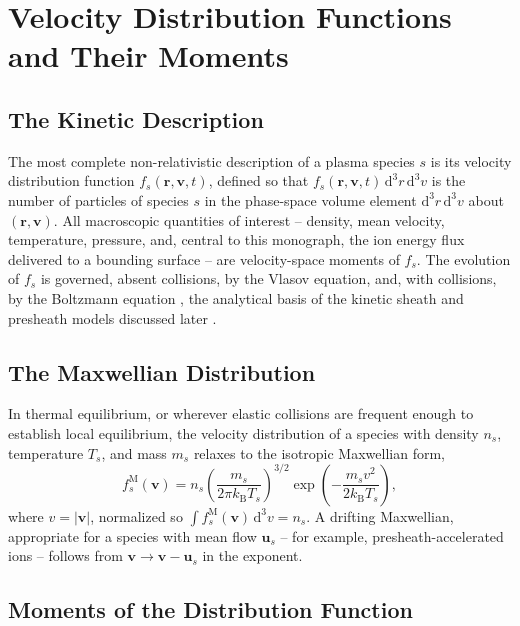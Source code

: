 \section{Velocity Distribution Functions and Their Moments}
\label{sec:distributions}

\subsection{The Kinetic Description}

The most complete non-relativistic description of a plasma species $s$ is its velocity distribution function $f_{s}(\mathbf{r},\mathbf{v},t)$, defined so that $f_{s}(\mathbf{r},\mathbf{v},t)\, \mathrm{d}^{3}r\, \mathrm{d}^{3}v$ is the number of particles of species $s$ in the phase-space volume element $\mathrm{d}^{3}r\, \mathrm{d}^{3}v$ about $(\mathbf{r},\mathbf{v})$. All macroscopic quantities of interest -- density, mean velocity, temperature, pressure, and, central to this monograph, the ion energy flux delivered to a bounding surface -- are velocity-space moments of $f_{s}$. The evolution of $f_{s}$ is governed, absent collisions, by the Vlasov equation, and, with collisions, by the Boltzmann equation \cite{ref0670}, the analytical basis of the kinetic sheath and presheath models discussed later \cite{ref0665,ref0666}.

\subsection{The Maxwellian Distribution}

In thermal equilibrium, or wherever elastic collisions are frequent enough to establish local equilibrium, the velocity distribution of a species with density $n_{s}$, temperature $T_{s}$, and mass $m_{s}$ relaxes to the isotropic Maxwellian form,
\begin{equation}
f_{s}^{\mathrm{M}}(\mathbf{v}) = n_{s}\left(\frac{m_{s}}{2\pi k_{\mathrm{B}} T_{s}}\right)^{3/2} \exp\!\left(-\frac{m_{s} v^{2}}{2 k_{\mathrm{B}} T_{s}}\right),
\label{eq:maxwellian}
\end{equation}
where $v = |\mathbf{v}|$, normalized so $\int f_{s}^{\mathrm{M}}(\mathbf{v})\, \mathrm{d}^{3}v = n_{s}$. A drifting Maxwellian, appropriate for a species with mean flow $\mathbf{u}_{s}$ -- for example, presheath-accelerated ions -- follows from $\mathbf{v} \to \mathbf{v} - \mathbf{u}_{s}$ in the exponent.

\subsection{Moments of the Distribution Function}

